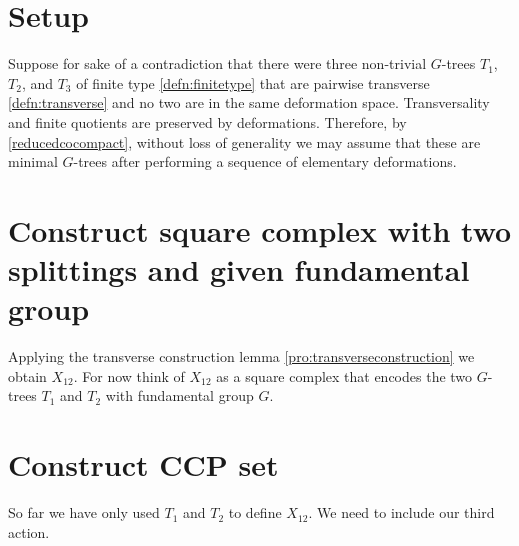 \documentclass[12pt,parskip=full]{report}
\theoremstyle{plain}
\theoremstyle{definition}
\begin{document}
\section{Setup}

Suppose for sake of a contradiction that there were three non-trivial \(G\)-trees \(T_{1}\), \(T_{2}\), and \(T_{3}\) of finite type \ref{defn:finitetype} that are pairwise transverse \ref{defn:transverse} and no two are in the same deformation space. Transversality and finite quotients are preserved by deformations. Therefore, by \ref{reducedcocompact}, without loss of generality we may assume that these are minimal \(G\)-trees after performing a sequence of elementary deformations. 

\section{Construct square complex with two splittings and given fundamental group}

Applying the transverse construction lemma \ref{pro:transverseconstruction} we obtain \(X_{12}\). For now think of $X_{12}$ as a square complex that encodes the two $G$-trees $T_1$ and $T_2$ with fundamental group $G$.

\section{Construct CCP set}

So far we have only used \(T_1\) and \(T_2\) to define \(X_{12}\). We need to include our third action. 
\end{document}
